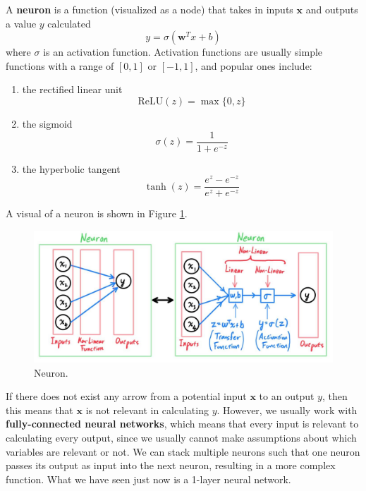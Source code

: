 \documentclass{article}
\begin{document}
    \begin{definition}[Neuron]
      A \textbf{neuron} is a function (visualized as a node) that takes in inputs $\mathbf{x}$ and outputs a value $y$ calculated 
        \[y = \sigma(\mathbf{w}^T x  + b)\]
      where $\sigma$ is an activation function. Activation functions are usually simple functions with a range of $[0, 1]$ or $[-1, 1]$, and popular ones include: 
    \begin{enumerate}
      \item the rectified linear unit 
        \[\mathrm{ReLU}(z) = \max\{0 , z\}\]
      \item the sigmoid 
        \[\sigma(z) = \frac{1}{1 + e^{-z}}\]
      \item the hyperbolic tangent 
        \[\tanh(z) = \frac{e^{z} - e^{-z}}{e^z + e^{-z}}\]
    \end{enumerate}
    A visual of a neuron is shown in Figure \ref{fig:neuron}. 
    \begin{figure}[H]
      \centering 
        \includegraphics[scale=0.25]{img/01_MLP/Neuron.jpg}
      \caption{Neuron. } 
      \label{fig:neuron}
    \end{figure}
    \end{definition}

    If there does not exist any arrow from a potential input $\mathbf{x}$ to an output $y$, then this means that $\mathbf{x}$ is not relevant in calculating $y$. However, we usually work with \textbf{fully-connected neural networks}, which means that every input is relevant to calculating every output, since we usually cannot make assumptions about which variables are relevant or not. We can stack multiple neurons such that one neuron passes its output as input into the next neuron, resulting in a more complex function. What we have seen just now is a 1-layer neural network. 
\end{document}
